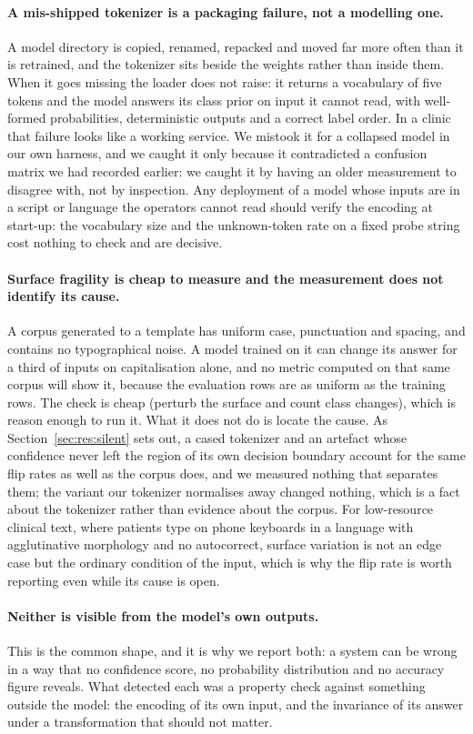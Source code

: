 \paragraph{A mis-shipped tokenizer is a packaging failure, not a modelling one.}
A model directory is copied, renamed, repacked and moved far more often than it
is retrained, and the tokenizer sits beside the weights rather than inside them.
When it goes missing the loader does not raise: it returns a vocabulary of five
tokens and the model answers its class prior on input it cannot read, with
well-formed probabilities, deterministic outputs and a correct label order. In a
clinic that failure looks like a working service. We mistook it for a collapsed
model in our own harness, and we caught it only because it contradicted a
confusion matrix we had recorded earlier: we caught it by
having an older measurement to disagree with, not by inspection. Any deployment
of a model whose inputs are in a script or language the operators cannot read
should verify the encoding at start-up: the vocabulary size and the
unknown-token rate on a fixed probe string cost nothing to check and are
decisive.

\paragraph{Surface fragility is cheap to measure and the measurement does not
identify its cause.} A corpus generated to a template has uniform case,
punctuation and spacing, and contains no typographical noise. A model trained on
it can change its answer for a third of inputs on capitalisation alone, and no
metric computed on that same corpus will show it, because the evaluation rows are
as uniform as the training rows. The check is cheap (perturb the surface and
count class changes), which is reason enough to run it. What it does not do is
locate the cause. As Section~\ref{sec:res:silent} sets out, a cased tokenizer
and an artefact whose confidence never left the region of its own decision
boundary account for the same flip rates as well as the corpus does, and we
measured nothing that separates them; the variant our tokenizer normalises away
changed nothing, which is a fact about the tokenizer rather than evidence about
the corpus. For low-resource clinical text, where patients type on phone
keyboards in a language with agglutinative morphology and no autocorrect,
surface variation is not an edge case but the ordinary condition of the input,
which is why the flip rate is worth reporting even while its cause is open.

\paragraph{Neither is visible from the model's own outputs.} This is the common
shape, and it is why we report both: a system can be wrong in a way that no
confidence score, no probability distribution and no accuracy figure reveals.
What detected each was a property check against something outside the model:
the encoding of its own input, and the invariance of its answer under a
transformation that should not matter.
